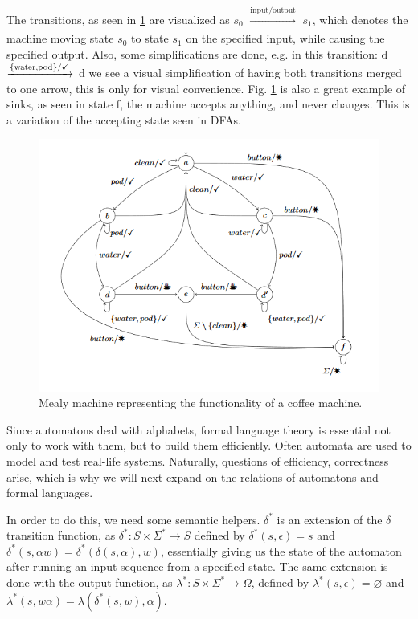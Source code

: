 The transitions, as seen in \ref{fig:coffeemealy} are visualized as $s_0$ $\xrightarrow[]{\text{input/output}}$ $s_1$, which denotes the machine moving  state $s_0$ to state $s_1$ on the specified input, while causing the specified output. Also, some simplifications are done, e.g. in this transition: d $\xrightarrow[]{\text{\{water,pod\}/\checkmark}}$ d we see a visual simplification of having both transitions merged to one arrow, this is only for visual convenience. Fig. \ref{fig:coffeemealy} is also a great example of sinks, as seen in state f, the machine accepts anything, and never changes. This is a variation of the accepting state seen in DFAs.

\begin{figure}[H]
	\centering
	\includegraphics[width=0.7\linewidth]{content/coffeemealy}
	\caption{Mealy machine representing the functionality of a coffee machine.\cite{Steffen2011}}
	\label{fig:coffeemealy}
\end{figure}

Since automatons deal with alphabets, formal language theory is essential not only to work with them, but to build them efficiently. Often automata are used to model and test real-life systems. Naturally, questions of efficiency, correctness arise, which is why we will next expand on the relations of automatons and formal languages.

In order to do this, we need some semantic helpers. $\delta^*$ is an extension of the $\delta$ transition function, as $\delta^*: S\times\Sigma^* \to S$ defined by $\delta^*(s,\epsilon) = s$ and $\delta^*(s, \alpha w) = \delta^*(\delta(s, \alpha), w)$, essentially giving us the state of the automaton after running an input sequence from a specified state. The same extension is done with the output function, as $\lambda^*: S\times\Sigma^* \to \Omega$, defined by $\lambda^*(s, \epsilon) = \varnothing$ and $\lambda^*(s, w\alpha) = \lambda(\delta^*(s, w), \alpha)$.




